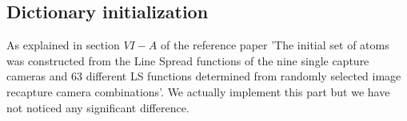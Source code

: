 \subsection{Dictionary initialization}
As explained in section $VI-A$ of the reference paper 'The initial set of atoms was constructed from the Line Spread functions of the nine single capture cameras and 63 different LS functions determined from randomly selected image recapture camera combinations'. We actually implement this part but we have not noticed any significant difference.